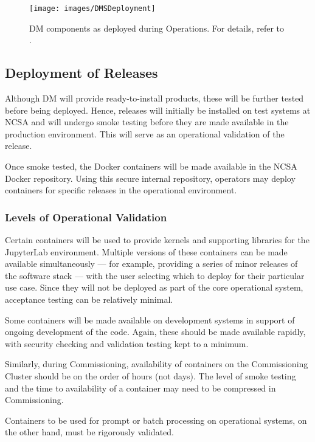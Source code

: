 \begin{figure}[htbp]
        \begin{center}
                \texttt{[image: images/DMSDeployment]}
                \caption{DM components as deployed during Operations.
                         For details, refer to .
                \label{fig:dmsdeploy}}
        \end{center}
\end{figure}

\subsection{Deployment of Releases}\label{sect:reldep}

Although DM will provide ready-to-install products, these will be further tested before being deployed.
Hence, releases will initially be installed on test systems at NCSA and will undergo smoke testing before they are made available in the production environment.
This will serve as an operational validation of the release.

Once smoke tested, the Docker containers will be made available in the NCSA Docker repository.
Using this secure internal repository, operators may deploy containers for specific releases in the operational environment.

\subsubsection{Levels of Operational Validation}

Certain containers will be used to provide kernels and supporting libraries for the JupyterLab environment.
Multiple versions of these containers can be made available simultaneously --- for example, providing a series of minor releases of the software stack --- with the user selecting which to deploy for their particular use case.
Since they will not be deployed as part of the core operational system, acceptance testing can be relatively minimal.

Some containers will be made available on development systems in support of ongoing development of the code.
Again, these should be made available rapidly, with security checking and validation testing kept to a minimum.

Similarly, during Commissioning, availability of containers on the Commissioning Cluster should be on the order of hours (not days).
The level of smoke testing and the time to availability of a container may need to be compressed in Commissioning.

Containers to be used for prompt or batch processing on operational systems, on the other hand, must be rigorously validated.
